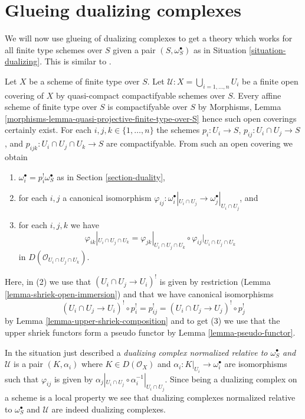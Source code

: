 \section{Glueing dualizing complexes}
\label{section-glue}

\noindent
We will now use glueing of dualizing complexes to get a theory which works for
all finite type schemes over $S$ given a pair $(S, \omega_S^\bullet)$
as in Situation \ref{situation-dualizing}. This is similar to
\cite[Remark on page 310]{R+D}.

\medskip\noindent
Let $X$ be a scheme of finite type over $S$.
Let $\mathcal{U} : X = \bigcup_{i = 1, \ldots, n} U_i$
be a finite open covering of $X$ by quasi-compact compactifyable
schemes over $S$. Every affine scheme of finite type
over $S$ is compactifyable over $S$ by
Morphisms, Lemma \ref{morphisms-lemma-quasi-projective-finite-type-over-S}
hence such open coverings certainly exist.
For each $i, j, k \in \{1, \ldots, n\}$
the schemes $p_i : U_i \to S$, $p_{ij} : U_i \cap U_j \to S$,
and $p_{ijk} : U_i \cap U_j \cap U_k \to S$ are compactifyable.
From such an open covering we obtain
\begin{enumerate}
\item $\omega_i^\bullet = p_i^!\omega_S^\bullet$
as in Section \ref{section-duality},
\item for each $i, j$ a canonical isomorphism
$\varphi_{ij} :
\omega_i^\bullet|_{U_i \cap U_j} \to \omega_j^\bullet|_{U_i \cap U_j}$, and
\item
\label{item-cocycle-glueing}
for each $i, j, k$ we have
$$
\varphi_{ik}|_{U_i \cap U_j \cap U_k} =
\varphi_{jk}|_{U_i \cap U_j \cap U_k} \circ
\varphi_{ij}|_{U_i \cap U_j \cap U_k}
$$
in $D(\mathcal{O}_{U_i \cap U_j \cap U_k})$.
\end{enumerate}
Here, in (2) we use that $(U_i \cap U_j \to U_i)^!$
is given by restriction (Lemma \ref{lemma-shriek-open-immersion})
and that we have canonical isomorphisms
$$
(U_i \cap U_j \to U_i)^! \circ p_i^! = p_{ij}^! =
(U_i \cap U_j \to U_j)^! \circ p_j^!
$$
by Lemma \ref{lemma-upper-shriek-composition} and to get (3) we use
that the upper shriek functors form a pseudo functor by
Lemma \ref{lemma-pseudo-functor}.

\medskip\noindent
In the situation just described a
{\it dualizing complex normalized relative to $\omega_S^\bullet$
and $\mathcal{U}$} is a pair $(K, \alpha_i)$ where $K \in D(\mathcal{O}_X)$
and $\alpha_i : K|_{U_i} \to \omega_i^\bullet$ are isomorphisms
such that $\varphi_{ij}$ is given by
$\alpha_j|_{U_i \cap U_j} \circ \alpha_i^{-1}|_{U_i \cap U_j}$.
Since being a dualizing complex on a scheme is a local property
we see that dualizing complexes normalized relative to $\omega_S^\bullet$
and $\mathcal{U}$ are indeed dualizing complexes.

